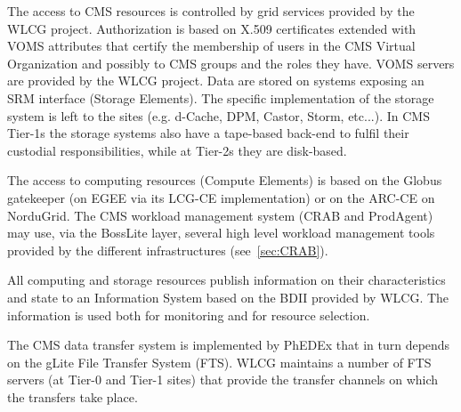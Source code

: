 The access to CMS resources is controlled by grid services provided by the WLCG project.
Authorization is based on X.509 certificates extended with VOMS attributes
that certify the membership of users in the CMS Virtual Organization and possibly 
to CMS groups and the roles they have.
VOMS servers are provided by the WLCG project.
Data are stored on systems exposing an SRM interface (Storage Elements).
The specific implementation of the storage system is left to the sites
(e.g. d-Cache, DPM, Castor, Storm, etc...). In CMS Tier-1s the storage
systems also have a tape-based back-end to fulfil their custodial
responsibilities, while at Tier-2s they are disk-based.

The access to computing resources (Compute Elements) is based on
the Globus gatekeeper (on EGEE via its LCG-CE implementation) or on the ARC-CE on NorduGrid.
The CMS workload management system (CRAB and ProdAgent) may use, via the BossLite layer,
several high level workload management tools provided by the different infrastructures
(see~\ref{sec:CRAB}).


All computing and storage resources publish information on their
characteristics and state to an Information System based
on the BDII provided by WLCG. The information is used both
for monitoring and for resource selection.

The CMS data transfer system is implemented by PhEDEx that
in turn depends on the gLite File Transfer System (FTS).
WLCG maintains a number of FTS servers (at Tier-0 and Tier-1 sites)
that provide the transfer channels on which the transfers take place.



